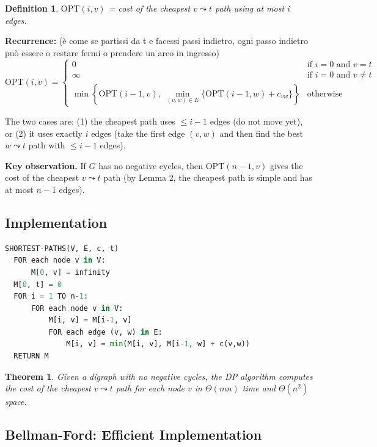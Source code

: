 \documentclass[12pt,a4paper]{report}
\newtheorem{definition}{Definition}
\newtheorem{theorem}{Theorem}
\begin{document}
\begin{definition}
$\text{OPT}(i, v)$ = cost of the cheapest $v \leadsto t$ path using at most $i$ edges.
\end{definition}

\textbf{Recurrence:}
(è come se partissi da t e facessi passi indietro, ogni passo indietro può essere o restare fermi o prendere un arco in ingresso)
\[
    \text{OPT}(i, v) =
    \begin{cases}
        0 & \text{if } i = 0 \text{ and } v = t \\
        \infty & \text{if } i = 0 \text{ and } v \neq t \\
        \min\!\left\{
            \text{OPT}(i-1, v),\;
            \min_{(v,w) \in E}\bigl\{\text{OPT}(i-1, w) + c_{vw}\bigr\}
        \right\} & \text{otherwise}
    \end{cases}
\]

The two cases are: (1) the cheapest path uses $\leq i - 1$ edges (do not move yet), or (2) it
uses exactly $i$ edges (take the first edge $(v, w)$ and then find the best $w \leadsto t$
path with $\leq i - 1$ edges).

\textbf{Key observation.} If $G$ has no negative cycles, then $\text{OPT}(n-1, v)$ gives
the cost of the cheapest $v \leadsto t$ path (by Lemma 2, the cheapest path is simple and has
at most $n - 1$ edges).

\subsection{Implementation}

\begin{lstlisting}[language=Python]
SHORTEST-PATHS(V, E, c, t)
  FOR each node v in V:
      M[0, v] = infinity
  M[0, t] = 0
  FOR i = 1 TO n-1:
      FOR each node v in V:
          M[i, v] = M[i-1, v]
          FOR each edge (v, w) in E:
              M[i, v] = min(M[i, v], M[i-1, w] + c(v,w))
  RETURN M
\end{lstlisting}

\begin{theorem}
Given a digraph with no negative cycles, the DP algorithm computes the cost of the cheapest
$v \leadsto t$ path for each node $v$ in $\Theta(mn)$ time and $\Theta(n^2)$ space.
\end{theorem}

\subsection{Bellman-Ford: Efficient Implementation}
\end{document}
